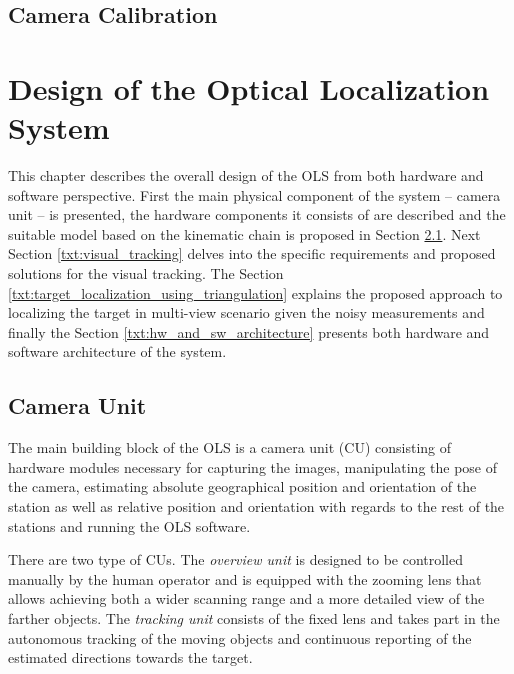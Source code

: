 \section{Camera Calibration}


\chapter{Design of the Optical Localization System} \label{txt:design_of_the_OLS}

This chapter describes the overall design of the OLS from both hardware and software perspective. First the main physical component of the system -- camera unit -- is presented, the hardware components it consists of are described and the suitable model based on the kinematic chain is proposed in Section \ref{txt:camera_unit}. Next Section \ref{txt:visual_tracking} delves into the specific requirements and proposed solutions for the visual tracking. The Section \ref{txt:target_localization_using_triangulation} explains the proposed approach to localizing the target in multi-view scenario given the noisy measurements and finally the Section \ref{txt:hw_and_sw_architecture} presents both hardware and software architecture of the system.

\section{Camera Unit} \label{txt:camera_unit}

The main building block of the OLS is a camera unit (CU) consisting of hardware modules necessary for capturing the images, manipulating the pose of the camera, estimating absolute geographical position and orientation of the station as well as relative position and orientation with regards to the rest of the stations and running the OLS software.

There are two type of CUs. The \textit{overview unit} is designed to be controlled manually by the human operator and is equipped with the zooming lens that allows achieving both a wider scanning range and a more detailed view of the farther objects. The \textit{tracking unit} consists of the fixed lens and takes part in the autonomous tracking of the moving objects and continuous reporting of the estimated directions towards the target.

